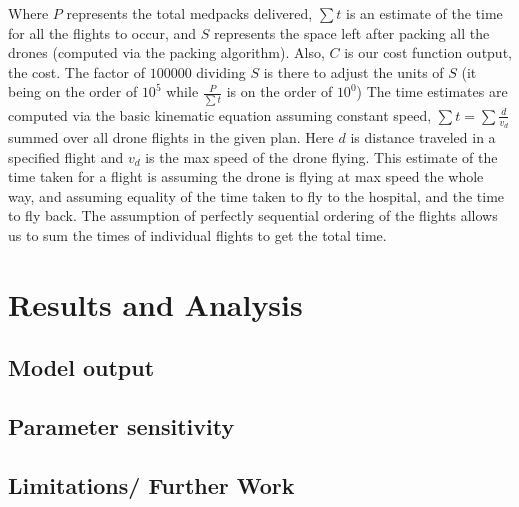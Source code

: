 \documentclass[12pt]{article}
\begin{document}
\begin{multicols}{2}
Where $P$ represents the total medpacks delivered, $\sum{t}$ is an estimate of the time for all the flights to occur, and $S$ represents the space left after packing all the drones (computed via the packing algorithm). Also, $C$ is our cost function output, the cost. The factor of $100000$ dividing $S$ is there to adjust the units of $S$ (it being on the order of $10^5$ while $\frac{P}{\sum{t}}$ is on the order of $10^0$) The time estimates are computed via the basic kinematic equation assuming constant speed, $\sum{t}=\sum{\frac{d}{v_d}}$ summed over all drone flights in the given plan. Here $d$ is distance traveled in a specified flight and $v_d$ is the max speed of the drone flying. This estimate of the time taken for a flight is assuming the drone is flying at max speed the whole way, and assuming equality of the time taken to fly to the hospital, and the time to fly back. The assumption of perfectly sequential ordering of the flights allows us to sum the times of individual flights to get the total time.

\section{Results and Analysis}

\subsection{Model output}
\lipsum[6]

\subsection{Parameter sensitivity}
\lipsum[7]




\subsection{Limitations/ Further Work}
\lipsum[8]

\printbibliography
\end{multicols}
\end{document}
